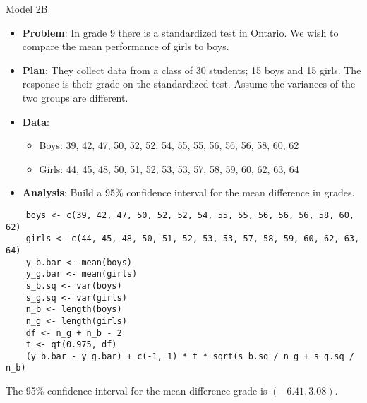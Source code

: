 \begin{Example}{Model 2B}{}
    \begin{itemize}
        \item \textbf{Problem}: In grade 9 there is a standardized test in Ontario. We wish to compare the mean performance of girls to boys.
        \item \textbf{Plan}: They collect data from a class of 30 students; 15 boys and 15 girls. The response is their grade on the standardized
              test. Assume the variances of the two groups are different.
        \item \textbf{Data}:
              \begin{itemize}
                  \item Boys: 39, 42, 47, 50, 52, 52, 54, 55, 55, 56, 56, 56, 58, 60, 62
                  \item Girls: 44, 45, 48, 50, 51, 52, 53, 53, 57, 58, 59, 60, 62, 63, 64
              \end{itemize}
        \item \textbf{Analysis}: Build a 95\% confidence interval for the mean difference
              in grades.
    \end{itemize}
    \begin{verbatim}
    boys <- c(39, 42, 47, 50, 52, 52, 54, 55, 55, 56, 56, 56, 58, 60, 62)
    girls <- c(44, 45, 48, 50, 51, 52, 53, 53, 57, 58, 59, 60, 62, 63, 64)
    y_b.bar <- mean(boys)
    y_g.bar <- mean(girls)
    s_b.sq <- var(boys)
    s_g.sq <- var(girls)
    n_b <- length(boys)
    n_g <- length(girls)
    df <- n_g + n_b - 2
    t <- qt(0.975, df)
    (y_b.bar - y_g.bar) + c(-1, 1) * t * sqrt(s_b.sq / n_g + s_g.sq / n_b)
    \end{verbatim}
    The 95\% confidence interval for the mean difference grade is
    $ (-6.41,3.08) $.
\end{Example}
